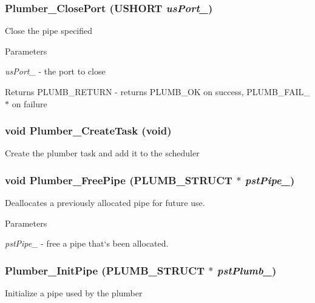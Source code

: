 \subsubsection[{Plumber\_\-ClosePort}]{ Plumber\_\-ClosePort (USHORT {\em usPort\_\-})}\label{plumber_8c_a37720494d161bd36041fd03411fae7a9}
Close the pipe specified


\begin{DoxyParams}{Parameters}
\item[{\em usPort\_\-}]-\/ the port to close \end{DoxyParams}
\begin{DoxyReturn}{Returns}
PLUMB\_\-RETURN -\/ returns PLUMB\_\-OK on success, PLUMB\_\-FAIL\_\-$\ast$ on failure 
\end{DoxyReturn}
\subsubsection[{Plumber\_\-CreateTask}]{\setlength{\rightskip}{0pt plus 5cm}void Plumber\_\-CreateTask (void)}\label{plumber_8c_add0ce810954566edd607547c4a2a810d}
Create the plumber task and add it to the scheduler 
\subsubsection[{Plumber\_\-FreePipe}]{\setlength{\rightskip}{0pt plus 5cm}void Plumber\_\-FreePipe ({\bf PLUMB\_\-STRUCT} $\ast$ {\em pstPipe\_\-})}\label{plumber_8c_ad136887c82a972feec4d50e4a8551ad7}
Deallocates a previously allocated pipe for future use.


\begin{DoxyParams}{Parameters}
\item[{\em pstPipe\_\-}]-\/ free a pipe that`s been allocated. \end{DoxyParams}
\subsubsection[{Plumber\_\-InitPipe}]{ Plumber\_\-InitPipe ({\bf PLUMB\_\-STRUCT} $\ast$ {\em pstPlumb\_\-})}\label{plumber_8c_a16ed72c8d0b67b11feffb236041148d4}
Initialize a pipe used by the plumber



